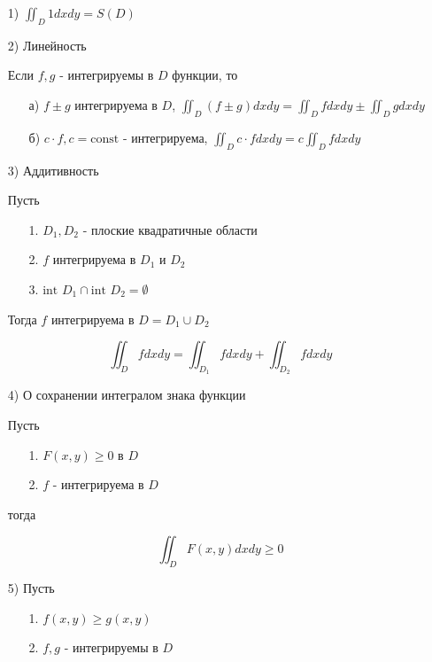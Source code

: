 \documentclass[a4paper, 14pt]{report}
\begin{document}
\begin{enumerate}
    \item[1)] $\iint_D 1 dxdy = S(D)$
    \item[2)] Линейность 
    
    Если $f,g$ - интегрируемы в $D$ функции, то 
    
    \begin{enumerate}
        \item[а)] $f \pm g$ интегрируема в $D$, $\iint_D (f \pm g) dxdy = \iint_D fdxdy \pm \iint_D g dxdy$
        \item[б)] $c \cdot f, c = \text{const}$ - интегрируема, $\iint_D c \cdot f dxdy = c \iint_D f dxdy$
    \end{enumerate}
    
    \item[3)] Аддитивность
    
    Пусть
    
    \begin{enumerate}
        \item[1.] $D_1,D_2$ - плоские квадратичные области
        \item[2.] $f$ интегрируема в $D_1$ и $D_2$
        \item[3.] $\text{int } D_1 \cap \text{int } D_2 = \emptyset$
    \end{enumerate}
    
    Тогда $f$ интегрируема в $D= D_1 \cup D_2$
    
    $$ \iint_D f dxdy = \iint_{D_1} f dxdy + \iint_{D_2} f dxdy $$
    
    \item[4)] О сохранении интегралом знака функции
    
    Пусть
    
    \begin{enumerate}
        \item[1.] $F(x,y) \geq 0$ в $D$
        \item[2.] $f$ - интегрируема в $D$
    \end{enumerate}
    
    тогда 
    
    $$ \iint_D F(x,y) dxdy \geq 0 $$
    
    \item[5)] Пусть
    
        \begin{enumerate}
        \item[1.] $ f(x,y) \geq g(x,y) $
        \item[2.] $ f,g $ - интегрируемы в $D$
    \end{enumerate}
    

\end{enumerate}
\end{document}
